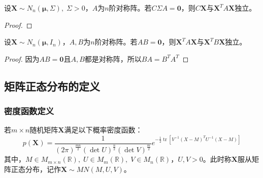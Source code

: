 \begin{corollary}
	设$\mathbf{X}\sim N_n(\boldsymbol{\mu},\Sigma),\;\Sigma>0$，$A$为$n$阶对称阵。若$C\Sigma A=\mathbf{0}$，则$C\mathbf{X}$与$\mathbf{X}^TA\mathbf{X}$独立。
\end{corollary}
\begin{proof}
	
\end{proof}
\begin{theorem}\label{theo:XAXXBXIndependent}
	设$\mathbf{X}\sim N_n(\boldsymbol{\mu},I_n)$，$A,B$为$n$阶对称阵。若$AB=\mathbf{0}$，则$\mathbf{X}^TA\mathbf{X}$与$\mathbf{X}^TB\mathbf{X}$独立。
\end{theorem}
\begin{proof}
	因为$AB=\mathbf{0}$且$A,B$都是对称阵，所以$BA=B^TA^T$
\end{proof}

\subsection{矩阵正态分布的定义}
\subsubsection{密度函数定义}
\begin{definition}\label{def:MatNormal1}
	若$m\times n$随机矩阵$\mathbf{X}$满足以下概率密度函数：
	\begin{equation*}
		p(\mathbf{X})=\frac{1}{(2\pi)^{\frac{mn}{2}}(\det U)^{\frac{n}{2}}(\det V)^{\frac{m}{2}}}e^{-\frac{1}{2}\operatorname{tr}[V^{-1}(X-M)^TU^{-1}(X-M)]}
	\end{equation*}
	其中，$M\in M_{m\times n}(\mathbb{R}),\;U\in M_{m}(\mathbb{R}),\;V\in M_{n}(\mathbb{R})$，$U,V>0$。此时称$\mathbf{X}$服从矩阵正态分布，记作$\mathbf{X}\sim MN(M,U,V)$。
\end{definition}
